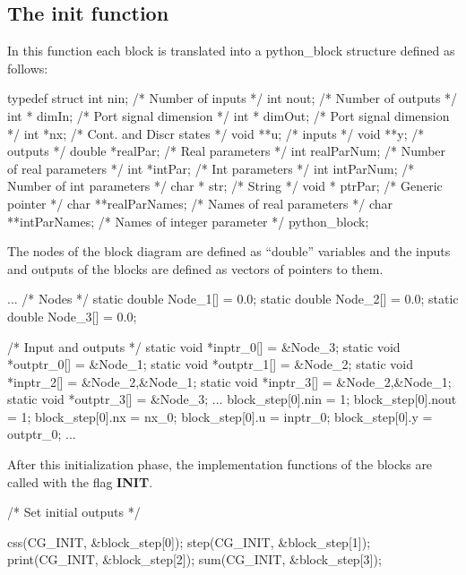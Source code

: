 \subsection{The init function}

In this function each block is translated into a python\_block structure defined as follows:

\begin{code}
typedef struct {
  int nin;             /* Number of inputs */
  int nout;            /* Number of outputs */
  int * dimIn;         /* Port signal dimension */
  int * dimOut;        /* Port signal dimension */
  int *nx;             /* Cont. and Discr states */
  void **u;            /* inputs */
  void **y;            /* outputs */
  double *realPar;     /* Real parameters */
  int realParNum;      /* Number of real parameters */
  int *intPar;         /* Int parameters */
  int intParNum;       /* Number of int parameters */
  char * str;          /* String */
  void * ptrPar;       /* Generic pointer */
  char **realParNames; /* Names of real parameters */
  char **intParNames;  /* Names of integer parameter */
} python_block;
\end{code}

The nodes of the block diagram are defined as ``double'' variables and the 
inputs and outputs of the blocks are defined as vectors of pointers to them.

\begin{code}
...
/* Nodes */
static double Node_1[] = {0.0};
static double Node_2[] = {0.0};
static double Node_3[] = {0.0};

/* Input and outputs */
static void *inptr_0[]  = {&Node_3};
static void *outptr_0[] = {&Node_1};
static void *outptr_1[] = {&Node_2};
static void *inptr_2[]  = {&Node_2,&Node_1};
static void *inptr_3[]  = {&Node_2,&Node_1};
static void *outptr_3[] = {&Node_3};
...
  block_step[0].nin  = 1;
  block_step[0].nout = 1;
  block_step[0].nx   = nx_0;
  block_step[0].u    = inptr_0;
  block_step[0].y    = outptr_0;
...
\end{code}

After this initialization phase, the implementation functions of the blocks are 
called with the 
flag \textbf{INIT}.

\begin{code}
/* Set initial outputs */

  css(CG_INIT, &block_step[0]);
  step(CG_INIT, &block_step[1]);
  print(CG_INIT, &block_step[2]);
  sum(CG_INIT, &block_step[3]);
\end{code}

